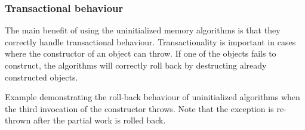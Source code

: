 \subsubsection{Transactional behaviour}

The main benefit of using the uninitialized memory algorithms is that they correctly handle transactional behaviour. Transactionality is important in cases where the constructor of an object can throw. If one of the objects fails to construct, the algorithms will correctly roll back by destructing already constructed objects.

\begin{box-note}
\footnotesize Example demonstrating the roll-back behaviour of uninitialized algorithms when the third invocation of the constructor throws. Note that the exception is re-thrown after the partial work is rolled back.
\tcblower
{}
\end{box-note}
